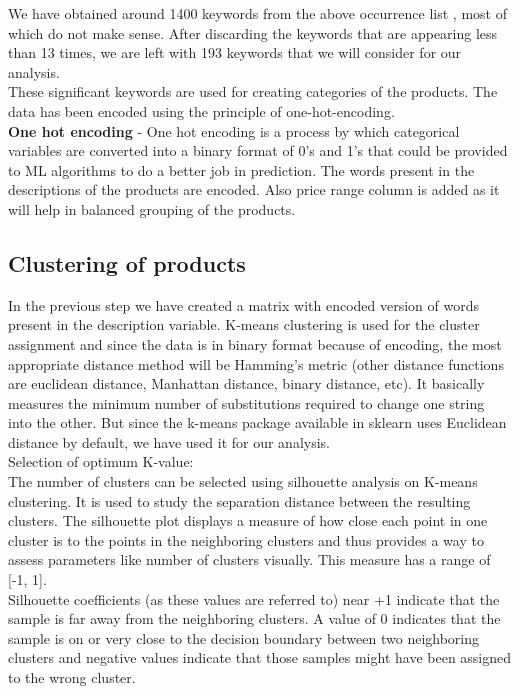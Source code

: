 We have obtained around 1400 keywords from the above occurrence list , most of which do not make sense. After discarding the keywords that are appearing less than 13 times, we are left with 193 keywords that we will consider for our analysis.\\

These significant keywords are used for creating categories of the products. The data has been encoded using the principle of one-hot-encoding.\\

\textbf{One hot encoding} - One hot encoding is a process by which categorical variables are converted into a binary format of 0's and 1's that could be provided to ML algorithms to do a better job in prediction. The words present in the descriptions of the products are encoded. Also price range column is added as it will help in balanced grouping of the products.\\

\subsection{Clustering of products}

In the previous step we have created a matrix with encoded version of words present in the description variable. K-means clustering is used for the cluster assignment and since the data is in binary format because of encoding, the most appropriate distance method will be Hamming's metric (other distance functions are euclidean distance, Manhattan distance, binary distance, etc). It basically measures the minimum number of substitutions required to change one string into the other. But since the k-means package available in sklearn uses Euclidean distance by default, we have used it for our analysis.\\
Selection of optimum K-value:\\

The number of clusters can be selected using silhouette analysis on K-means clustering. It is used to study the separation distance between the resulting clusters. The silhouette plot displays a measure of how close each point in one cluster is to the points in the neighboring clusters and thus provides a way to assess parameters like number of clusters visually. This measure has a range of [-1, 1].\\
Silhouette coefficients (as these values are referred to) near +1 indicate that the sample is far away from the neighboring clusters. A value of 0 indicates that the sample is on or very close to the decision boundary between two neighboring clusters and negative values indicate that those samples might have been assigned to the wrong cluster.\\

